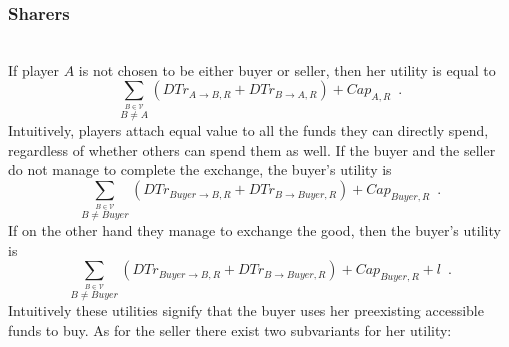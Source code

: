   \subsubsection{Sharers} \ \\

    If player $A$ is not chosen to be either buyer or seller, then her utility is equal to 
    \begin{equation*}
      \sum\limits_{\overset{B \in \mathcal{V}}{B \neq A}}\left(DTr_{A \rightarrow B, R} + DTr_{B \rightarrow A, R}\right) +
      Cap_{A, R} \enspace.
    \end{equation*}
    Intuitively, players attach equal value to all the funds they can directly spend, regardless of whether others can spend
    them as well. If the buyer and the seller do not manage to complete the exchange, the buyer's utility is
    \begin{equation*}
      \sum\limits_{\overset{B \in \mathcal{V}}{B \neq Buyer}}\left(DTr_{Buyer \rightarrow B, R} + DTr_{B \rightarrow Buyer,
      R}\right) + Cap_{Buyer, R} \enspace.
    \end{equation*}
    If on the other hand they manage to exchange the good, then the buyer's utility is 
    \begin{equation*}
      \sum\limits_{\overset{B \in \mathcal{V}}{B \neq Buyer}}\left(DTr_{Buyer \rightarrow B, R} + DTr_{B \rightarrow Buyer,
      R}\right) + Cap_{Buyer, R} + l \enspace.
    \end{equation*}
    Intuitively these utilities signify that the buyer uses her preexisting accessible funds to buy. As for the seller there
    exist two subvariants for her utility:
